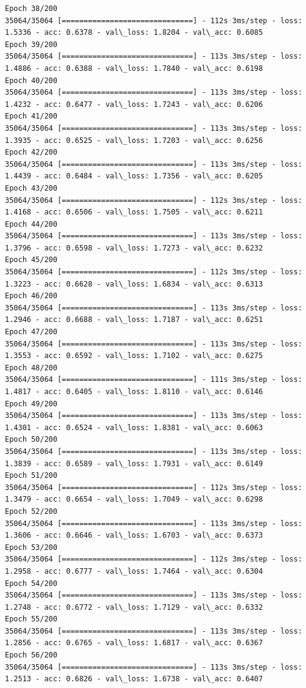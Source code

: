 \documentclass[11pt]{article}
\begin{document}
\begin{Verbatim}[commandchars=\\\{\}]
Epoch 38/200
35064/35064 [==============================] - 112s 3ms/step - loss: 1.5336 - acc: 0.6378 - val\_loss: 1.8204 - val\_acc: 0.6085
Epoch 39/200
35064/35064 [==============================] - 113s 3ms/step - loss: 1.4886 - acc: 0.6388 - val\_loss: 1.7840 - val\_acc: 0.6198
Epoch 40/200
35064/35064 [==============================] - 113s 3ms/step - loss: 1.4232 - acc: 0.6477 - val\_loss: 1.7243 - val\_acc: 0.6206
Epoch 41/200
35064/35064 [==============================] - 113s 3ms/step - loss: 1.3935 - acc: 0.6525 - val\_loss: 1.7203 - val\_acc: 0.6256
Epoch 42/200
35064/35064 [==============================] - 113s 3ms/step - loss: 1.4439 - acc: 0.6484 - val\_loss: 1.7356 - val\_acc: 0.6205
Epoch 43/200
35064/35064 [==============================] - 112s 3ms/step - loss: 1.4168 - acc: 0.6506 - val\_loss: 1.7505 - val\_acc: 0.6211
Epoch 44/200
35064/35064 [==============================] - 113s 3ms/step - loss: 1.3796 - acc: 0.6598 - val\_loss: 1.7273 - val\_acc: 0.6232
Epoch 45/200
35064/35064 [==============================] - 112s 3ms/step - loss: 1.3223 - acc: 0.6628 - val\_loss: 1.6834 - val\_acc: 0.6313
Epoch 46/200
35064/35064 [==============================] - 113s 3ms/step - loss: 1.2946 - acc: 0.6688 - val\_loss: 1.7187 - val\_acc: 0.6251
Epoch 47/200
35064/35064 [==============================] - 113s 3ms/step - loss: 1.3553 - acc: 0.6592 - val\_loss: 1.7102 - val\_acc: 0.6275
Epoch 48/200
35064/35064 [==============================] - 111s 3ms/step - loss: 1.4817 - acc: 0.6405 - val\_loss: 1.8110 - val\_acc: 0.6146
Epoch 49/200
35064/35064 [==============================] - 113s 3ms/step - loss: 1.4301 - acc: 0.6524 - val\_loss: 1.8381 - val\_acc: 0.6063
Epoch 50/200
35064/35064 [==============================] - 113s 3ms/step - loss: 1.3839 - acc: 0.6589 - val\_loss: 1.7931 - val\_acc: 0.6149
Epoch 51/200
35064/35064 [==============================] - 112s 3ms/step - loss: 1.3479 - acc: 0.6654 - val\_loss: 1.7049 - val\_acc: 0.6298
Epoch 52/200
35064/35064 [==============================] - 113s 3ms/step - loss: 1.3606 - acc: 0.6646 - val\_loss: 1.6703 - val\_acc: 0.6373
Epoch 53/200
35064/35064 [==============================] - 112s 3ms/step - loss: 1.2958 - acc: 0.6777 - val\_loss: 1.7464 - val\_acc: 0.6304
Epoch 54/200
35064/35064 [==============================] - 113s 3ms/step - loss: 1.2748 - acc: 0.6772 - val\_loss: 1.7129 - val\_acc: 0.6332
Epoch 55/200
35064/35064 [==============================] - 113s 3ms/step - loss: 1.2856 - acc: 0.6765 - val\_loss: 1.6817 - val\_acc: 0.6367
Epoch 56/200
35064/35064 [==============================] - 113s 3ms/step - loss: 1.2513 - acc: 0.6826 - val\_loss: 1.6738 - val\_acc: 0.6407

\end{Verbatim}
\end{document}
